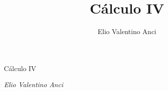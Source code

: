 \documentclass[12pt,a4paper]{report}
\title{Cálculo IV}
\author{Elio Valentino Anci}
\begin{document}
\begin{titlepage}
  \centering
  \vspace*{\fill}
  {\Huge \ttfamily Cálculo IV \par}
  \vspace{2cm}
  \begin{figure}[ht]
    \centering
    
  \end{figure}
  \vspace{2cm}
  {\large \itshape Elio Valentino Anci \par}
  \vspace*{\fill}
\end{titlepage}
\tableofcontents









\printbibliography[type=book, title={Bibliografía}]


\printbibliography[type=online, title={Referencias}]
\end{document}
